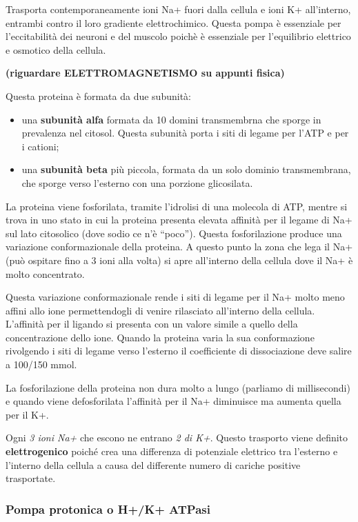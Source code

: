 \documentclass[]{article}
\begin{document}
Trasporta contemporaneamente ioni Na+ fuori dalla cellula e ioni K+
all'interno, entrambi contro il loro gradiente elettrochimico. Questa
pompa è essenziale per l'eccitabilità dei neuroni e del muscolo poichè è
essenziale per l'equilibrio elettrico e osmotico della cellula.

\textbf{(riguardare ELETTROMAGNETISMO su appunti fisica)}

Questa proteina è formata da due subunità:

\begin{itemize}
\itemsep1pt\parskip0pt
\item
  una \textbf{subunità alfa} formata da 10 domini transmembrna che
  sporge in prevalenza nel citosol. Questa subunità porta i siti di
  legame per l'ATP e per i cationi;
\item
  una \textbf{subunità beta} più piccola, formata da un solo dominio
  transmembrana, che sporge verso l'esterno con una porzione
  glicosilata.
\end{itemize}

La proteina viene fosforilata, tramite l'idrolisi di una molecola di
ATP, mentre si trova in uno stato in cui la proteina presenta elevata
affinità per il legame di Na+ sul lato citosolico (dove sodio ce n'è
``poco''). Questa fosforilazione produce una variazione conformazionale
della proteina. A questo punto la zona che lega il Na+ (può ospitare
fino a 3 ioni alla volta) si apre all'interno della cellula dove il Na+
è molto concentrato.

Questa variazione conformazionale rende i siti di legame per il Na+
molto meno affini allo ione permettendogli di venire rilasciato
all'interno della cellula. L'affinità per il ligando si presenta con un
valore simile a quello della concentrazione dello ione. Quando la
proteina varia la sua conformazione rivolgendo i siti di legame verso
l'esterno il coefficiente di dissociazione deve salire a 100/150 mmol.

La fosforilazione della proteina non dura molto a lungo (parliamo di
millisecondi) e quando viene defosforilata l'affinità per il Na+
diminuisce ma aumenta quella per il K+.

Ogni \emph{3 ioni Na+} che escono ne entrano \emph{2 di K+}. Questo
trasporto viene definito \textbf{elettrogenico} poiché crea una
differenza di potenziale elettrico tra l'esterno e l'interno della
cellula a causa del differente numero di cariche positive trasportate.

\subsubsection{Pompa protonica o H+/K+
ATPasi}\label{pompa-protonica-o-hk-atpasi}
\end{document}
